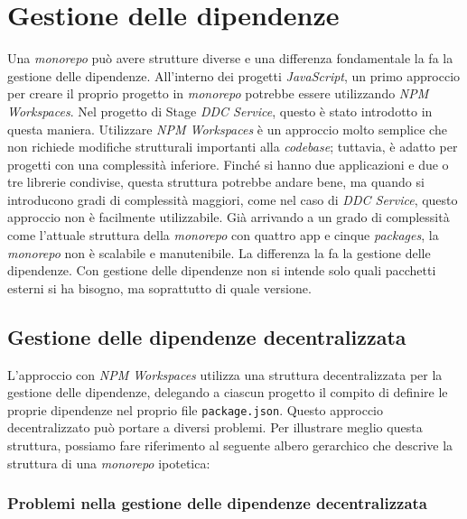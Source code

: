 \pagebreak

\section{Gestione delle dipendenze}
Una \textit{monorepo} può avere strutture diverse e una differenza fondamentale la fa la gestione delle dipendenze. 
All'interno dei progetti \textit{JavaScript}, un primo approccio per creare il proprio progetto in \textit{monorepo} potrebbe essere utilizzando \textit{NPM Workspaces}.
Nel progetto di Stage \textit{DDC Service}, questo è stato introdotto in questa maniera.
Utilizzare \textit{NPM Workspaces} è un approccio molto semplice che non richiede modifiche strutturali importanti alla \textit{codebase}; tuttavia, è adatto per progetti con una complessità inferiore.
Finché si hanno due applicazioni e due o tre librerie condivise, questa struttura potrebbe andare bene, ma quando si introducono gradi di complessità maggiori, come nel caso di \textit{DDC Service}, questo approccio non è facilmente utilizzabile.
Già arrivando a un grado di complessità come l'attuale struttura della \textit{monorepo} con quattro app e cinque \textit{packages}, la \textit{monorepo} non è scalabile e manutenibile.
La differenza la fa la gestione delle dipendenze.
Con gestione delle dipendenze non si intende solo quali pacchetti esterni si ha bisogno, ma soprattutto di quale versione.

\subsection{Gestione delle dipendenze decentralizzata}
L'approccio con \textit{NPM Workspaces} utilizza una struttura decentralizzata per la gestione delle dipendenze, delegando a ciascun progetto il compito di definire le proprie dipendenze nel proprio file \texttt{package.json}.
Questo approccio decentralizzato può portare a diversi problemi.
\pagebreak
Per illustrare meglio questa struttura, possiamo fare riferimento al seguente albero gerarchico che descrive la struttura di una \textit{monorepo} ipotetica:



\subsubsection{Problemi nella gestione delle dipendenze decentralizzata}

